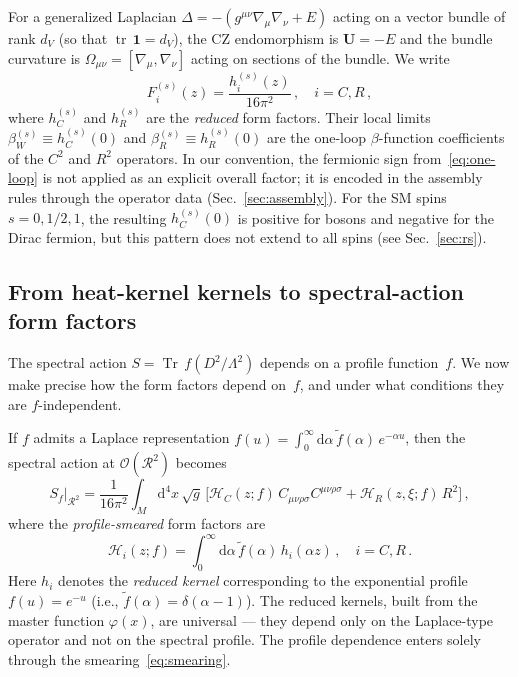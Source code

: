 \documentclass[aps,prd,twocolumn,superscriptaddress,nofootinbib,floatfix]{revtex4-2}
\theoremstyle{definition}
\theoremstyle{remark}
\newcommand{\Weylsq}{C_{\mu\nu\rho\sigma}C^{\mu\nu\rho\sigma}}
\newcommand{\dd}{\mathrm{d}}
\newcommand{\tr}{\operatorname{tr}}
\newcommand{\Tr}{\operatorname{Tr}}
\begin{document}
For a generalized Laplacian $\Delta = -(g^{\mu\nu}\nabla_\mu\nabla_\nu + E)$
acting on a vector bundle of rank $d_V$ (so that $\tr\,\mathbf{1} = d_V$),
the CZ endomorphism is $\mathbf{U} = -E$ and the bundle curvature is
$\Omega_{\mu\nu} = [\nabla_\mu, \nabla_\nu]$ acting on sections of the
bundle. We write
\begin{equation}
  F_i^{(s)}(z) = \frac{h_i^{(s)}(z)}{16\pi^2}\,,\quad i = C, R\,,
  \label{eq:Fi-hi-def}
\end{equation}
where $h_C^{(s)}$ and $h_R^{(s)}$ are the \emph{reduced} form factors.
Their local limits $\beta_W^{(s)} \equiv h_C^{(s)}(0)$ and
$\beta_R^{(s)} \equiv h_R^{(s)}(0)$ are the one-loop $\beta$-function
coefficients of the $C^2$ and $R^2$ operators. In our convention, the fermionic sign from~\eqref{eq:one-loop} is not
applied as an explicit overall factor; it is encoded in the assembly rules
through the operator data (Sec.~\ref{sec:assembly}). For the SM spins
$s = 0, 1/2, 1$, the resulting $h_C^{(s)}(0)$ is positive for bosons and
negative for the Dirac fermion, but this pattern does not extend to all
spins (see Sec.~\ref{sec:rs}).

\subsection{From heat-kernel kernels to spectral-action form factors}
\label{sec:smearing}

The spectral action $S = \Tr\,f(D^2/\Lambda^2)$ depends on a profile
function~$f$. We now make precise how the form factors depend on~$f$, and
under what conditions they are $f$-independent.

If $f$ admits a Laplace representation
$f(u) = \int_0^\infty \dd\alpha\,\tilde{f}(\alpha)\,e^{-\alpha u}$,
then the spectral action at $\mathcal{O}(\mathcal{R}^2)$ becomes
\begin{equation}
  S_f\big|_{\mathcal{R}^2}
  = \frac{1}{16\pi^2}\int_M \dd^4x\,\sqrt{g}\,\bigl[
    \mathcal{H}_C(z;f)\,\Weylsq + \mathcal{H}_R(z,\xi;f)\,R^2
  \bigr]\,,
  \label{eq:smeared-action}
\end{equation}
where the \emph{profile-smeared} form factors are
\begin{equation}
  \mathcal{H}_i(z;f) = \int_0^\infty \dd\alpha\,\tilde{f}(\alpha)\,
    h_i(\alpha z)\,,\quad i = C,R\,.
  \label{eq:smearing}
\end{equation}
Here $h_i$ denotes the \emph{reduced kernel} corresponding to the exponential
profile $f(u) = e^{-u}$ (i.e.,
$\tilde{f}(\alpha) = \delta(\alpha - 1)$). The reduced kernels, built from
the master function $\varphi(x)$, are universal --- they depend only on the
Laplace-type operator and not on the spectral profile. The
profile dependence enters solely through the smearing~\eqref{eq:smearing}.
\end{document}
